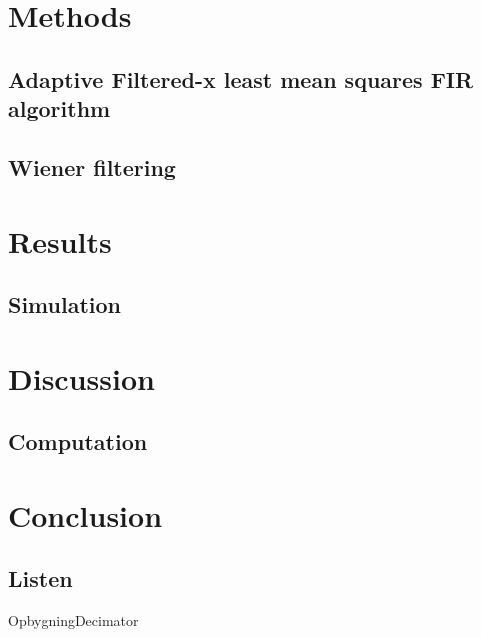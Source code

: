 \section{Methods}







\subsection{Adaptive Filtered-x least mean squares FIR algorithm}

\subsection{Wiener filtering}

\section{Results}

\subsection{Simulation}


\section{Discussion}

\subsection{Computation}

\section{Conclusion}

\subsection{Listen}

\begin{frame}{Opbygning}{Decimator}	

\end{frame}